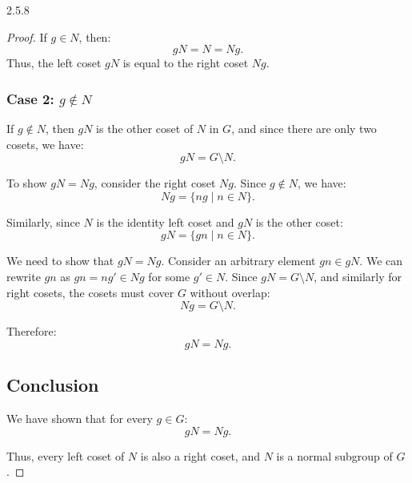 \documentclass[12pt]{amsart}
\theoremstyle{definition}
\numberwithin{equation}{section}
\begin{document}
\begin{exercise}{2.5.8}
\begin{proof}
    If \(g \in N\), then:
    \[
    gN = N = Ng.
    \]
    Thus, the left coset \(gN\) is equal to the right coset \(Ng\).
    
    \subsubsection*{Case 2: \(g \notin N\)}
    
    If \(g \notin N\), then \(gN\) is the other coset of \(N\) in \(G\), and since there are only two cosets, we have:
    \[
    gN = G \setminus N.
    \]
    
    To show \(gN = Ng\), consider the right coset \(Ng\). Since \(g \notin N\), we have:
    \[
    Ng = \{ng \mid n \in N\}.
    \]
    
    Similarly, since \(N\) is the identity left coset and \(gN\) is the other coset:
    \[
    gN = \{gn \mid n \in N\}.
    \]
    
    We need to show that \(gN = Ng\). Consider an arbitrary element \(gn \in gN\). We can rewrite \(gn\) as \(gn = ng' \in Ng\) for some \(g' \in N\). Since \(gN = G \setminus N\), and similarly for right cosets, the cosets must cover \(G\) without overlap:
    \[
    Ng = G \setminus N.
    \]
    
    Therefore:
    \[
    gN = Ng.
    \]
    
    \subsection*{Conclusion}
    
    We have shown that for every \(g \in G\):
    \[
    gN = Ng.
    \]
    
    Thus, every left coset of \(N\) is also a right coset, and \(N\) is a normal subgroup of \(G\).
\end{proof}

\end{exercise}
\newpage
    
\end{document}
